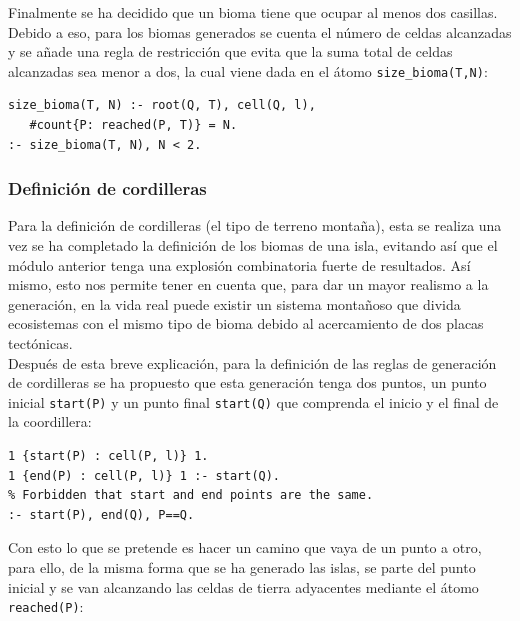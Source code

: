 Finalmente se ha decidido que un bioma tiene que ocupar al menos dos casillas. Debido a eso, para los biomas generados se cuenta el número de celdas alcanzadas y se añade una regla de restricción que evita que la suma total de celdas alcanzadas sea menor a dos, la cual viene dada en el átomo \texttt{size\_bioma(T,N)}: \\

\begin{lstlisting}[label=lst:tmax]
size_bioma(T, N) :- root(Q, T), cell(Q, l), 
   #count{P: reached(P, T)} = N.
:- size_bioma(T, N), N < 2.
\end{lstlisting}

\subsubsection{Definición de cordilleras}

Para la definición de cordilleras (el tipo de terreno montaña), esta se realiza una vez se ha completado la definición de los biomas de una isla, evitando así que el módulo anterior tenga una explosión combinatoria fuerte de resultados. Así mismo, esto nos permite tener en cuenta que, para dar un mayor realismo a la generación, en la vida real puede existir un sistema montañoso que divida ecosistemas con el mismo tipo de bioma debido al acercamiento de dos placas tectónicas. \\

Después de esta breve explicación, para la definición de las reglas de generación de cordilleras se ha propuesto que esta generación tenga dos puntos, un punto inicial \texttt{start(P)} y un punto final \texttt{start(Q)} que comprenda el inicio y el final de la coordillera: \\

\begin{lstlisting}[label=lst:pointsystem]
% Generate the start and the end position
1 {start(P) : cell(P, l)} 1.
1 {end(P) : cell(P, l)} 1 :- start(Q).
% Forbidden that start and end points are the same.
:- start(P), end(Q), P==Q.
\end{lstlisting}

\hspace{1em}

Con esto lo que se pretende es hacer un camino que vaya de un punto a otro, para ello, de la misma forma que se ha generado las islas, se parte del punto inicial y se van alcanzando las celdas de tierra adyacentes mediante el átomo \texttt{reached(P)}: \\

